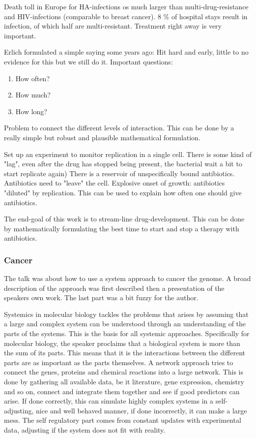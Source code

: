 \documentclass[12p]{article}
\begin{document}
Death toll in Europe for HA-infections os much larger than multi-drug-resistance and HIV-infections (comparable to breast cancer).
8 \% of hospital stays result in infection, of which half are multi-resistant.
Treatment right away is very important.

Erlich formulated a simple saying some years ago: Hit hard and early, little to no evidence for this but we still do it.
Important questions: 

\begin{enumerate}
    \item
	How often?
    \item
	How much?
    \item
	How long?
\end{enumerate}

Problem to connect the different levels of interaction.
This can be done by a really simple but robust and plausible mathematical formulation.

Set up an experiment to monitor replication in a single cell.
There is some kind of "lag", even after the drug has stopped being present, the bacterial wait a bit to start replicate again)
There is a reservoir of unspecifically bound antibiotics.
Antibiotics need to "leave" the cell.
Explosive onset of growth: antibiotics "diluted" by replication.
This can be used to explain how often one should give antibiotics.

The end-goal of this work is to stream-line drug-development.
This can be done by mathematically formulating the best time to start and stop a therapy with antibiotics.


\subsubsection{Cancer}

The talk was about how to use a system approach to cancer the genome.
A broad description of the approach was first described then a presentation of the speakers own work.
The last part was a bit fuzzy for the author.

Systemics in molecular biology tackles the problems that arises by assuming that a large and complex system can be understood through an understanding of the parts of the systems.
This is the basis for all systemic approaches.
Specifically for molecular biology, the speaker proclaims that a biological system is more than the sum of its parts.
This means that it is the interactions between the different parts are as important as the parts themselves.
A network approach tries to connect the genes, proteins and chemical reactions into a large network.
This is done by gathering all available data, be it literature, gene expression, chemistry and so on, connect and integrate them together and see if good predictors can arise.
If done correctly, this can simulate highly complex systems in a self-adjusting, nice and well behaved manner, if done incorrectly, it can make a large mess.
The self regulatory part comes from constant updates with experimental data, adjusting if the system does not fit with reality.
\end{document}

